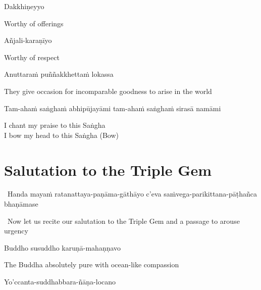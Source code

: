 Dakkhiṇeyyo

\begin{english}
  Worthy of offerings
\end{english}

Añjali-karaṇīyo

\begin{english}
  Worthy of respect
\end{english}

Anuttaraṁ puññakkhettaṁ lokassa

\begin{english}
  They give occasion for incomparable goodness to arise in the world
\end{english}

\begin{pali-hang}
  Tam-ahaṁ saṅghaṁ abhipūjayāmi tam-ahaṁ saṅghaṁ sirasā namāmi
\end{pali-hang}

\begin{english}
  I chant my praise to this Saṅgha\\
  I bow my head to this Saṅgha \hfill{(Bow)}
\end{english}

\section{Salutation to the Triple Gem}
\label{salutation}

\begin{leader}
  \anglebracketleft\ \hspace{-0.5mm}Handa mayaṁ ratanattaya-paṇāma-gāthāyo c'eva saṁvega-parikittana-pāṭhañca bhaṇāmase \hspace{-0.5mm}\anglebracketright\
\end{leader}
\begin{leader-english-belowpali}
  \anglebracketleft\ \hspace{-0.5mm}Now let us recite our salutation to the Triple Gem and a passage to arouse urgency \hspace{-0.5mm}\anglebracketright\
\end{leader-english-belowpali}

Buddho susuddho karuṇā-mahaṇṇavo

\begin{english}
  The Buddha absolutely pure with ocean-like compassion
\end{english}

Yo'ccanta-suddhabbara-ñāṇa-locano

